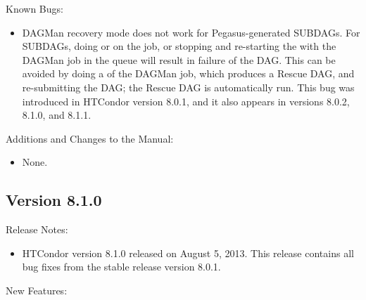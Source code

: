 \noindent Known Bugs:

\begin{itemize}
\item DAGMan recovery mode does not work for Pegasus-generated SUBDAGs.
For SUBDAGs, doing  or  on
the  job, or stopping and re-starting the
 with the DAGMan
job in the queue will result in failure of the DAG.  This can be
avoided by doing a  of the DAGMan job, which produces a Rescue
DAG, and re-submitting the DAG; the Rescue DAG is automatically run.
This bug was introduced in HTCondor version 8.0.1, and it also appears
in versions 8.0.2, 8.1.0, and 8.1.1.

\end{itemize}

\noindent Additions and Changes to the Manual:

\begin{itemize}

\item None.

\end{itemize}


\subsection*{\label{sec:New-8-1-0}Version 8.1.0}

\noindent Release Notes:

\begin{itemize}

\item HTCondor version 8.1.0 released on August 5, 2013.
This release contains all bug fixes from the stable release version 8.0.1.

\end{itemize}


\noindent New Features:

